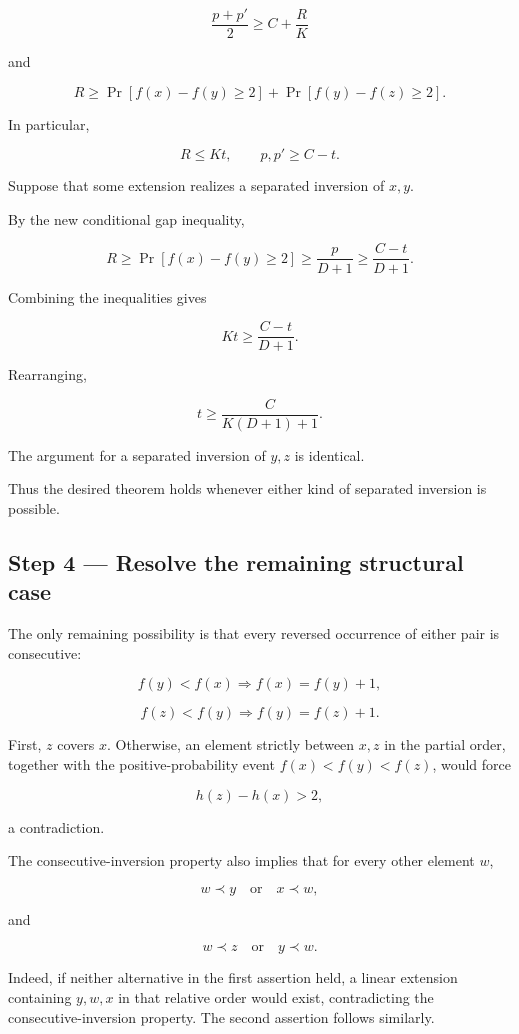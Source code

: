 \documentclass[11pt]{article}
\begin{document}
\[
\frac{p+p'}2\geq C+\frac R K
\]

and

\[
R\geq
\Pr[f(x)-f(y)\geq2]
+
\Pr[f(y)-f(z)\geq2].
\]

In particular,

\[
R\leq Kt,
\qquad
p,p'\geq C-t.
\]

Suppose that some extension realizes a separated inversion of \(x,y\).

By the new conditional gap inequality,

\[
R\geq
\Pr[f(x)-f(y)\geq2]
\geq\frac{p}{D+1}
\geq\frac{C-t}{D+1}.
\]

Combining the inequalities gives

\[
Kt\geq\frac{C-t}{D+1}.
\]

Rearranging,

\[
\boxed{
t\geq\frac{C}{K(D+1)+1}.
}
\]

The argument for a separated inversion of \(y,z\) is identical.

Thus the desired theorem holds whenever either kind of separated inversion is possible.

\subsection{Step 4 --- Resolve the remaining structural case}

The only remaining possibility is that every reversed occurrence of either pair is consecutive:

\[
f(y)<f(x)\Longrightarrow f(x)=f(y)+1,
\]

\[
f(z)<f(y)\Longrightarrow f(y)=f(z)+1.
\]

First, \(z\) covers \(x\). Otherwise, an element strictly between \(x,z\) in the partial order, together with the positive-probability event \(f(x)<f(y)<f(z)\), would force

\[
h(z)-h(x)>2,
\]

a contradiction.

The consecutive-inversion property also implies that for every other element \(w\),

\[
w\prec y\quad\text{or}\quad x\prec w,
\]

and

\[
w\prec z\quad\text{or}\quad y\prec w.
\]

Indeed, if neither alternative in the first assertion held, a linear extension containing \(y,w,x\) in that relative order would exist, contradicting the consecutive-inversion property. The second assertion follows similarly.
\end{document}
